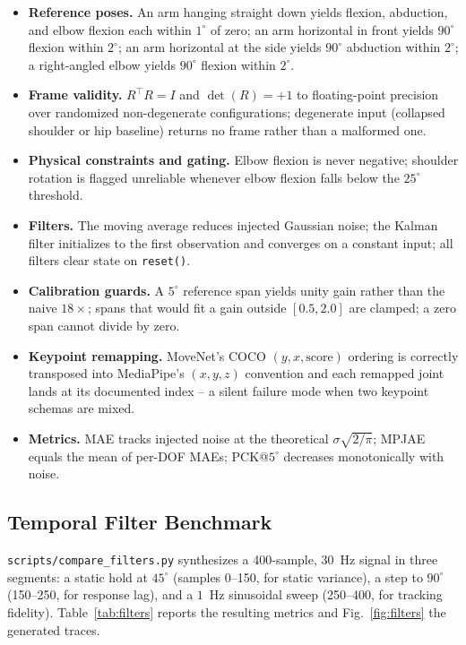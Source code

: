 \documentclass[conference]{IEEEtran}
\begin{document}
\begin{itemize}
\item \textbf{Reference poses.} An arm hanging straight down yields
flexion, abduction, and elbow flexion each within $1^\circ$ of zero; an
arm horizontal in front yields $90^\circ$ flexion within $2^\circ$; an
arm horizontal at the side yields $90^\circ$ abduction within $2^\circ$;
a right-angled elbow yields $90^\circ$ flexion within $2^\circ$.
\item \textbf{Frame validity.} $R^{\!\top}R = I$ and $\det(R) = +1$ to
floating-point precision over randomized non-degenerate configurations;
degenerate input (collapsed shoulder or hip baseline) returns no frame
rather than a malformed one.
\item \textbf{Physical constraints and gating.} Elbow flexion is never
negative; shoulder rotation is flagged unreliable whenever elbow flexion
falls below the $25^\circ$ threshold.
\item \textbf{Filters.} The moving average reduces injected Gaussian
noise; the Kalman filter initializes to the first observation and
converges on a constant input; all filters clear state on \texttt{reset()}.
\item \textbf{Calibration guards.} A $5^\circ$ reference span yields
unity gain rather than the naive $18\times$; spans that would fit a gain
outside $[0.5, 2.0]$ are clamped; a zero span cannot divide by zero.
\item \textbf{Keypoint remapping.} MoveNet's COCO $(y, x, \text{score})$
ordering is correctly transposed into MediaPipe's $(x, y, z)$ convention
and each remapped joint lands at its documented index -- a silent
failure mode when two keypoint schemas are mixed.
\item \textbf{Metrics.} MAE tracks injected noise at the theoretical
$\sigma\sqrt{2/\pi}$; MPJAE equals the mean of per-DOF MAEs; PCK@$5^\circ$
decreases monotonically with noise.
\end{itemize}

\subsection{Temporal Filter Benchmark}
\label{sec:results-filters}
\texttt{scripts/compare\_filters.py} synthesizes a 400-sample, $30$~Hz
signal in three segments: a static hold at $45^\circ$ (samples 0--150,
for static variance), a step to $90^\circ$ (150--250, for response lag),
and a $1$~Hz sinusoidal sweep (250--400, for tracking fidelity).
Table~\ref{tab:filters} reports the resulting metrics and
Fig.~\ref{fig:filters} the generated traces.
\end{document}
